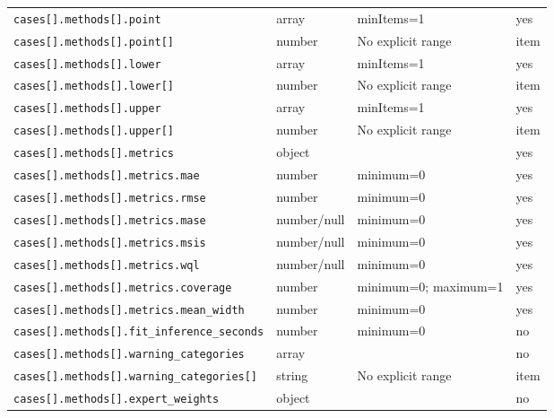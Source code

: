 \begin{longtable}{@{}p{}p{}p{}p{}@{}}
\texttt{cases[].\allowbreak{}methods[].\allowbreak{}point} & array & minItems=1 & yes\\
\texttt{cases[].\allowbreak{}methods[].\allowbreak{}point[]} & number & No explicit range & item\\
\texttt{cases[].\allowbreak{}methods[].\allowbreak{}lower} & array & minItems=1 & yes\\
\texttt{cases[].\allowbreak{}methods[].\allowbreak{}lower[]} & number & No explicit range & item\\
\texttt{cases[].\allowbreak{}methods[].\allowbreak{}upper} & array & minItems=1 & yes\\
\texttt{cases[].\allowbreak{}methods[].\allowbreak{}upper[]} & number & No explicit range & item\\
\texttt{cases[].\allowbreak{}methods[].\allowbreak{}metrics} & object &  & yes\\
\texttt{cases[].\allowbreak{}methods[].\allowbreak{}metrics.\allowbreak{}mae} & number & minimum=0 & yes\\
\texttt{cases[].\allowbreak{}methods[].\allowbreak{}metrics.\allowbreak{}rmse} & number & minimum=0 & yes\\
\texttt{cases[].\allowbreak{}methods[].\allowbreak{}metrics.\allowbreak{}mase} & number/null & minimum=0 & yes\\
\texttt{cases[].\allowbreak{}methods[].\allowbreak{}metrics.\allowbreak{}msis} & number/null & minimum=0 & yes\\
\texttt{cases[].\allowbreak{}methods[].\allowbreak{}metrics.\allowbreak{}wql} & number/null & minimum=0 & yes\\
\texttt{cases[].\allowbreak{}methods[].\allowbreak{}metrics.\allowbreak{}coverage} & number & minimum=0; maximum=1 & yes\\
\texttt{cases[].\allowbreak{}methods[].\allowbreak{}metrics.\allowbreak{}mean\_\allowbreak{}width} & number & minimum=0 & yes\\
\texttt{cases[].\allowbreak{}methods[].\allowbreak{}fit\_\allowbreak{}inference\_\allowbreak{}seconds} & number & minimum=0 & no\\
\texttt{cases[].\allowbreak{}methods[].\allowbreak{}warning\_\allowbreak{}categories} & array &  & no\\
\texttt{cases[].\allowbreak{}methods[].\allowbreak{}warning\_\allowbreak{}categories[]} & string & No explicit range & item\\
\texttt{cases[].\allowbreak{}methods[].\allowbreak{}expert\_\allowbreak{}weights} & object &  & no\\

\end{longtable}
